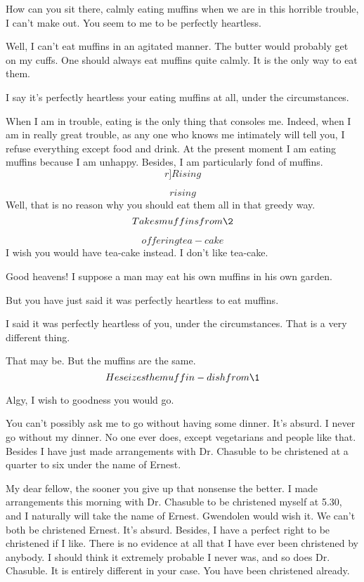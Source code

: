 \documentclass{book}
\begin{document}
\1  How can you sit there, calmly eating muffins when we are in
this horrible trouble, I can't make out.  You seem to me to be
perfectly heartless.

\2  Well, I can't eat muffins in an agitated manner.  The
butter would probably get on my cuffs.  One should always eat
muffins quite calmly.  It is the only way to eat them.

\1  I say it's perfectly heartless your eating muffins at all,
under the circumstances.

\2  When I am in trouble, eating is the only thing that
consoles me.  Indeed, when I am in really great trouble, as any one
who knows me intimately will tell you, I refuse everything except
food and drink.  At the present moment I am eating muffins because
I am unhappy.  Besides, I am particularly fond of muffins.
\[r]Rising\]

\1  \[rising\]  Well, that is no reason why you should eat them
all in that greedy way. \[Takes muffins from \2\]

\2  \[offering tea-cake\]  I wish you would have tea-cake
instead.  I don't like tea-cake.

\1  Good heavens!  I suppose a man may eat his own muffins in
his own garden.

\2  But you have just said it was perfectly heartless to eat
muffins.

\1  I said it was perfectly heartless of you, under the
circumstances.  That is a very different thing.

\2  That may be.  But the muffins are the same.  \[He seizes
the muffin-dish from \1\]

\1  Algy, I wish to goodness you would go.

\2  You can't possibly ask me to go without having some
dinner.  It's absurd.  I never go without my dinner.  No one ever
does, except vegetarians and people like that.  Besides I have just
made arrangements with Dr. Chasuble to be christened at a quarter
to six under the name of Ernest.

\1  My dear fellow, the sooner you give up that nonsense the
better.  I made arrangements this morning with Dr. Chasuble to be
christened myself at 5.30, and I naturally will take the name of
Ernest.  Gwendolen would wish it.  We can't both be christened
Ernest.  It's absurd.  Besides, I have a perfect right to be
christened if I like.  There is no evidence at all that I have ever
been christened by anybody.  I should think it extremely probable I
never was, and so does Dr. Chasuble.  It is entirely different in
your case.  You have been christened already.
\end{document}
